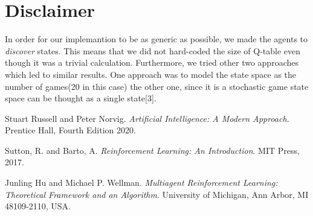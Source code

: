\documentclass[10pt,a4paper,twocolumn]{article}
\begin{document}
	\section{Disclaimer}
	In order for our implemantion to be as generic as possible, we made the agents to \textit{discover} states. This means that we did not hard-coded the size of Q-table even though it was a trivial calculation. Furthermore, we tried other two approaches which led to similar results. One approach was to model the state space as the number of games(20 in this case) the other one, since it is a stochastic game state space can be thought as a single state[3].	



	\begin{thebibliography}{9}
		Stuart Russell and Peter Norvig. 
		\textit{Artificial Intelligence: A Modern Approach}. 
		Prentice Hall, Fourth Edition 2020.
		
		Sutton, R. and Barto, A. 
		\textit{Reinforcement Learning: An Introduction}. 
		MIT Press, 2017.
		
		Junling Hu and Michael P. Wellman.
		\textit{Multiagent Reinforcement Learning: Theoretical Framework and an Algorithm}. 
		University of Michigan, Ann Arbor, MI 48109-2110, USA.

	\end{thebibliography}
	
\end{document}
